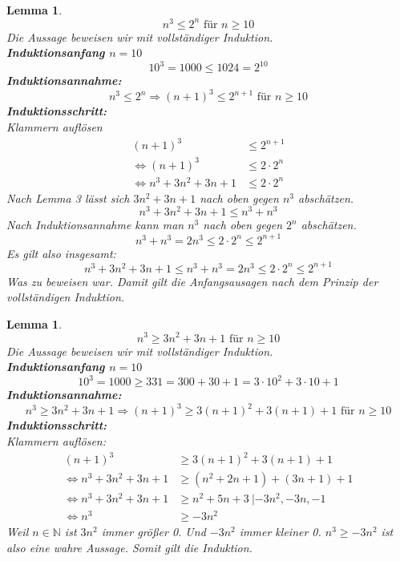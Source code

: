 \documentclass{article}
\begin{document}
    \newtheorem{lemma2}[lemma_counter]{Lemma}
    \begin{lemma2}
        \[ n^3 \leq 2^n \text{ für } n \geq 10 \]
        Die Aussage beweisen wir mit vollständiger Induktion. \\
        \textbf{Induktionsanfang \(n=10\)}
        \[10^3 = 1000 \leq 1024 = 2^{10} \]
        \textbf{Induktionsannahme:}
        \[ n^3 \leq 2^n \Rightarrow {(n+1)}^3 \leq 2^{ n+1 } \text{ für } n \geq 10 \]
        \textbf{Induktionsschritt:} \\
        Klammern auflösen
        \begin{align*}
            {(n+1)}^3 & \leq 2^{ n+1 } \\
            \Leftrightarrow {(n+1)}^3 & \leq 2 \cdot 2^n \\
            \Leftrightarrow n^3 + 3n^2 + 3n + 1 & \leq 2 \cdot 2^n
        \end{align*} 
        Nach Lemma 3 lässt sich \(3n^2 + 3n + 1\) nach oben gegen \(n^3\) abschätzen.
        \[ n^3 + 3n^2 + 3n + 1 \leq n^3 + n^3 \]
        Nach Induktionsannahme kann man \(n^3\) nach oben gegen \(2^n\) abschätzen.
        \[ n^3 + n^3 = 2 n^3 \leq 2 \cdot 2^n \leq 2^{n+1} \]
        Es gilt also insgesamt:
        \[n^3 + 3n^2 + 3n + 1 \leq n^3 + n^3 = 2 n^3 \leq 2 \cdot 2^n \leq 2^{n+1} \]
        Was zu beweisen war. Damit gilt die Anfangsausagen nach dem Prinzip der vollständigen Induktion.
    \end{lemma2}

    \newtheorem{lemma3}[lemma_counter]{Lemma}
    \begin{lemma3}
        \[n^3 \geq 3n^2 + 3n + 1 \text{ für } n \geq 10 \]
        Die Aussage beweisen wir mit vollständiger Induktion. \\
        \textbf{Induktionsanfang \(n=10\)}
        \[10^3 = 1000 \geq 331 = 300 + 30 + 1 = 3 \cdot 10^2 + 3 \cdot 10 + 1\]
        \textbf{Induktionsannahme:}
        \[ n^3 \geq 3n^2 + 3n + 1 \Rightarrow {(n+1)}^3 \geq 3{(n+1)}^2 + 3(n+1) + 1 \text{ für } n \geq 10 \]
        \textbf{Induktionsschritt:} \\
        Klammern auflösen:
        \begin{align*}
            {(n+1)}^3 & \geq 3{(n+1)}^2 + 3(n+1) + 1 \\
            \Leftrightarrow n^3 + 3n^2 + 3n + 1 & \geq (n^2 + 2n + 1) + (3n + 1) + 1 \\
            \Leftrightarrow n^3 + 3n^2 + 3n + 1 & \geq n^2 + 5n + 3 \: | -3n^2, -3n, -1 \\
            \Leftrightarrow n^3 & \geq -3n^2
        \end{align*}
        Weil \(n \in \mathbb{N}\) ist \(3n^2\) immer größer 0. Und \(-3n^2\) immer kleiner 0.
        \(n^3 \geq -3n^2\) ist also eine wahre Aussage. Somit gilt die Induktion.
    \end{lemma3}
\end{document}
